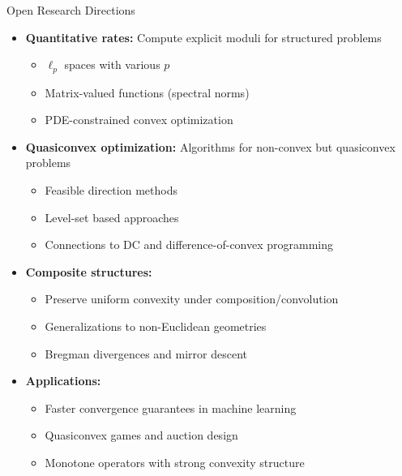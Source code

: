 \documentclass[aspectratio=169,10pt]{beamer}
\begin{document}
\begin{frame}{Open Research Directions}

\begin{itemize}
\item \textbf{Quantitative rates:} Compute explicit moduli for structured problems
  \begin{itemize}
  \item $\ell_p$ spaces with various $p$
  \item Matrix-valued functions (spectral norms)
  \item PDE-constrained convex optimization
  \end{itemize}

\item \textbf{Quasiconvex optimization:} Algorithms for non-convex but quasiconvex problems
  \begin{itemize}
  \item Feasible direction methods
  \item Level-set based approaches
  \item Connections to DC and difference-of-convex programming
  \end{itemize}

\item \textbf{Composite structures:}
  \begin{itemize}
  \item Preserve uniform convexity under composition/convolution
  \item Generalizations to non-Euclidean geometries
  \item Bregman divergences and mirror descent
  \end{itemize}

\item \textbf{Applications:}
  \begin{itemize}
  \item Faster convergence guarantees in machine learning
  \item Quasiconvex games and auction design
  \item Monotone operators with strong convexity structure
  \end{itemize}
\end{itemize}
\end{frame}
\end{document}
